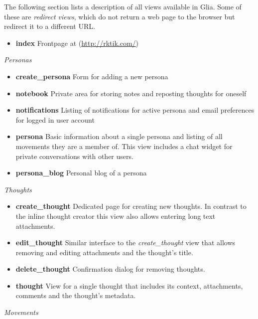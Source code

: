 The following section lists a description of all views available in
Glia. Some of these are \emph{redirect views}, which do not return a web
page to the browser but redirect it to a different URL.

\begin{itemize}
\tightlist
\item
  \textbf{index} Frontpage at (\url{http://rktik.com/})
\end{itemize}

\emph{Personas}

\begin{itemize}
\tightlist
\item
  \textbf{create\_persona} Form for adding a new persona
\item
  \textbf{notebook} Private area for storing notes and reposting
  thoughts for oneself
\item
  \textbf{notifications} Listing of notifications for active persona and
  email preferences for logged in user account
\item
  \textbf{persona} Basic information about a single persona and listing
  of all movements they are a member of. This view includes a chat
  widget for private conversations with other users.
\item
  \textbf{persona\_blog} Personal blog of a persona
\end{itemize}

\emph{Thoughts}

\begin{itemize}
\tightlist
\item
  \textbf{create\_thought} Dedicated page for creating new thoughts. In
  contrast to the inline thought creator this view also allows entering
  long text attachments.
\item
  \textbf{edit\_thought} Similar interface to the \emph{create\_thought}
  view that allows removing and editing attachments and the thought's
  title.
\item
  \textbf{delete\_thought} Confirmation dialog for removing thoughts.
\item
  \textbf{thought} View for a single thought that includes its context,
  attachments, comments and the thought's metadata.
\end{itemize}

\emph{Movements}

